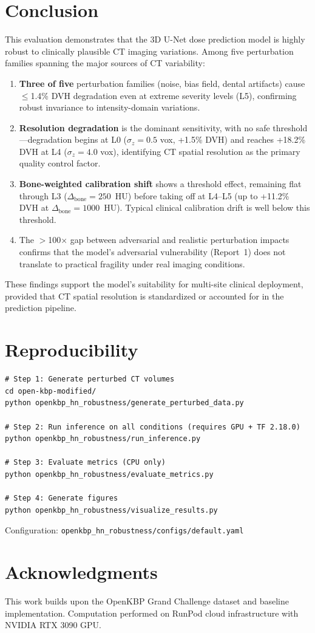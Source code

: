 \documentclass[11pt,a4paper]{article}
\begin{document}
\section{Conclusion}

This evaluation demonstrates that the 3D U-Net dose prediction model is highly robust to clinically plausible CT imaging variations. Among five perturbation families spanning the major sources of CT variability:

\begin{enumerate}
    \item \textbf{Three of five} perturbation families (noise, bias field, dental artifacts) cause $\leq$1.4\% DVH degradation even at extreme severity levels (L5), confirming robust invariance to intensity-domain variations.
    \item \textbf{Resolution degradation} is the dominant sensitivity, with no safe threshold---degradation begins at L0 ($\sigma_z = 0.5$ vox, +1.5\% DVH) and reaches +18.2\% DVH at L4 ($\sigma_z = 4.0$ vox), identifying CT spatial resolution as the primary quality control factor.
    \item \textbf{Bone-weighted calibration shift} shows a threshold effect, remaining flat through L3 ($\Delta_\text{bone} = 250$~HU) before taking off at L4--L5 (up to +11.2\% DVH at $\Delta_\text{bone} = 1000$~HU). Typical clinical calibration drift is well below this threshold.
    \item The $>$100$\times$ gap between adversarial and realistic perturbation impacts confirms that the model's adversarial vulnerability (Report~1) does not translate to practical fragility under real imaging conditions.
\end{enumerate}

These findings support the model's suitability for multi-site clinical deployment, provided that CT spatial resolution is standardized or accounted for in the prediction pipeline.

\section{Reproducibility}

\begin{verbatim}
# Step 1: Generate perturbed CT volumes
cd open-kbp-modified/
python openkbp_hn_robustness/generate_perturbed_data.py

# Step 2: Run inference on all conditions (requires GPU + TF 2.18.0)
python openkbp_hn_robustness/run_inference.py

# Step 3: Evaluate metrics (CPU only)
python openkbp_hn_robustness/evaluate_metrics.py

# Step 4: Generate figures
python openkbp_hn_robustness/visualize_results.py
\end{verbatim}

Configuration: \texttt{openkbp\_hn\_robustness/configs/default.yaml}

\section*{Acknowledgments}

This work builds upon the OpenKBP Grand Challenge dataset and baseline implementation. Computation performed on RunPod cloud infrastructure with NVIDIA RTX 3090 GPU.
\end{document}
